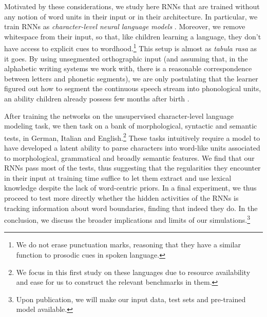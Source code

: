 Motivated by these considerations, we study here RNNs that are trained
without any notion of word units in their input or in their
architecture. In particular, we train RNNs as \emph{character-level
  neural language models}
\cite[CNLMs,][]{Mikolov:etal:2011,Sutskever:etal:2011,DBLP:journals/corr/Graves13}. Moreover,
we remove whitespace from their input, so that, like children learning
a language, they don't have access to explicit cues to
wordhood.\footnote{We do not erase punctuation marks, reasoning that
  they have a similar function to prosodic cues in spoken language.}
This setup is almost as \emph{tabula rasa} as it goes. By using
unsegmented orthographic input (and assuming that, in the alphabetic
writing systems we work with, there is a reasonable correspondence
between letters and phonetic segments), we are only postulating that
the learner figured out how to segment the continuous speech stream
into phonological units, an ability children already possess few
months after birth
\cite[e.g.,][]{Maye:etal:2002,Kuhl:2004}.

After training the networks on the unsupervised character-level
language modeling task, we then task on a bank of morphological,
syntactic and semantic tests, in German, Italian and
English.\footnote{We focus in this first study on these languages due
  to resource availability and ease for us to construct the relevant
  benchmarks in them.}  These tasks intuitively require a model to
have developed a latent ability to parse characters into word-like
units associated to morphological, grammatical and broadly semantic
features. We find that our RNNs pass most of the tests, thus
suggesting that the regularities they encounter in their input at
training time suffice to let them extract and use lexical knowledge
despite the lack of word-centric priors. In a final experiment, we
thus proceed to test more directly whether the hidden activities of
the RNNs is tracking information about word boundaries, finding that
indeed they do.  In the conclusion, we discuss the broader
implications and limits of our simulations.\footnote{Upon publication,
  we will make our input data, test sets and pre-trained model
  available.}

